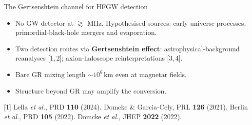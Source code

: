 \begin{frame}{The Gertsenshtein channel for HFGW detection}
  
  \begin{itemize}\itemsep0.8em
    \item No GW detector at $\gtrsim$ MHz.  Hypothesised sources: early-universe processes, primordial-black-hole mergers and evaporation.

    \item Two detection routes via \textbf{Gertsenshtein effect}: astrophysical-background reanalyses [1,\,2]; axion-haloscope reinterpretations [3,\,4].

    \item Bare GR mixing length $\sim 10^{6}$\,km even at magnetar fields.

    \item Structure beyond GR may amplify the conversion.%
  \end{itemize}

  \vfill
  {\tiny [1] Lella \emph{et al.}, PRD \textbf{110} (2024).
  \quad [2] Domcke \& Garcia-Cely, PRL \textbf{126} (2021).
  \quad [3] Berlin \emph{et al.}, PRD \textbf{105} (2022).
  \quad [4] Domcke \emph{et al.}, JHEP \textbf{2022} (2022).}
\end{frame}
